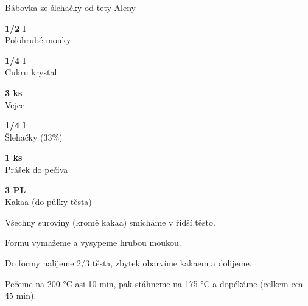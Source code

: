 \documentclass[11pt,a4paper]{article}
\begin{document}
\begin{recipe}[BurntOrange]{Bábovka ze šlehačky od tety Aleny}
    \begin{ingredients}
        \item \parbox[t]{\linewidth}{\raggedright \piece \textbf{1/2 l}\\ Polohrubé mouky}
        \item \parbox[t]{\linewidth}{\raggedright \piece \textbf{1/4 l}\\ Cukru krystal}
        \item \parbox[t]{\linewidth}{\raggedright \piece \textbf{3 ks}\\ Vejce}
        \item \parbox[t]{\linewidth}{\raggedright \liquid \textbf{1/4 l}\\ Šlehačky (33\%)}
        \item \parbox[t]{\linewidth}{\raggedright \piece \textbf{1 ks}\\ Prášek do pečiva}
        \item \parbox[t]{\linewidth}{\raggedright \spoon \textbf{3 PL}\\ Kakaa (do půlky těsta)}
    \end{ingredients}
    \begin{steps}
        \item Všechny suroviny (kromě kakaa) smícháme v řidší těsto.
        \item Formu vymažeme a vysypeme hrubou moukou.
        \item Do formy nalijeme 2/3 těsta, zbytek obarvíme kakaem a dolijeme.
        \item Pečeme na 200 °C asi 10 min, pak stáhneme na 175 °C a dopékáme (celkem cca 45 min).
    \end{steps}
\end{recipe}
\end{document}

